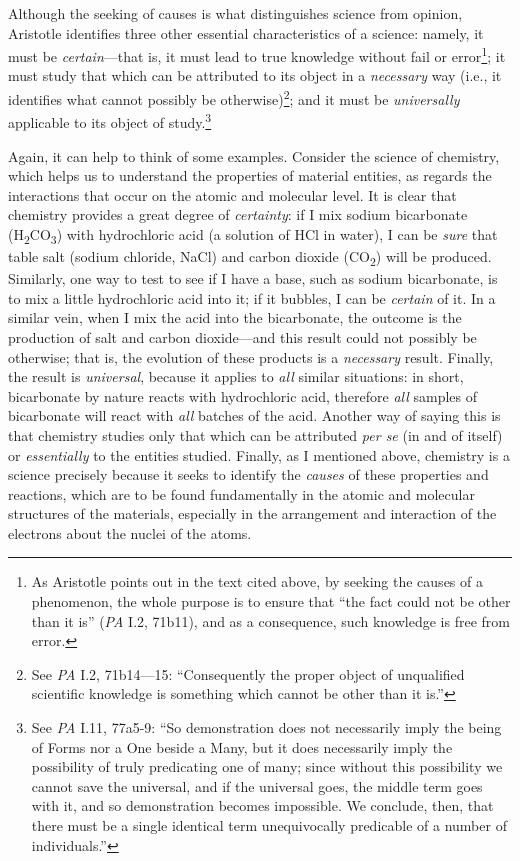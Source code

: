 \documentclass[article,12pt,a4paper,oneside]{memoir}
\begin{document}
    Although the seeking of causes is what distinguishes science from
    opinion, Aristotle identifies three other essential characteristics
    of a science: namely, it must be \emph{certain}---that is, it must
    lead to true knowledge without fail or error\footnote{As Aristotle
      points out in the text cited above, by seeking the causes of a
      phenomenon, the whole purpose is to ensure that ``the fact could
      not be other than it is'' (\emph{PA} I.2, 71b11), and as a
      consequence, such knowledge is free from error.}; it must study
    that which can be attributed to its object in a \emph{necessary} way
    (i.e., it identifies what cannot possibly be otherwise)\footnote{See
      \emph{PA} I.2, 71b14---15: ``Consequently the proper object of
      unqualified scientific knowledge is something which cannot be
      other than it is.''}; and it must be \emph{universally} applicable
    to its object of study.\footnote{See \emph{PA} I.11, 77a5-9: ``So
      demonstration does not necessarily imply the being of Forms nor a
      One beside a Many, but it does necessarily imply the possibility
      of truly predicating one of many; since without this possibility
      we cannot save the universal, and if the universal goes, the
      middle term goes with it, and so demonstration becomes impossible.
      We conclude, then, that there must be a single identical term
      unequivocally predicable of a number of individuals.''}

    Again, it can help to think of some examples. Consider the science
    of chemistry, which helps us to understand the properties of
    material entities, as regards the interactions that occur on the
    atomic and molecular level. It is clear that chemistry provides a
    great degree of \emph{certainty}: if I mix sodium bicarbonate
    (H\textsubscript{2}CO\textsubscript{3}) with hydrochloric acid (a
    solution of HCl in water), I can be \emph{sure} that table salt
    (sodium chloride, NaCl) and carbon dioxide (CO\textsubscript{2})
    will be produced. Similarly, one way to test to see if I have a
    base, such as sodium bicarbonate, is to mix a little hydrochloric
    acid into it; if it bubbles, I can be \emph{certain} of it. In a
    similar vein, when I mix the acid into the bicarbonate, the outcome
    is the production of salt and carbon dioxide---and this result could
    not possibly be otherwise; that is, the evolution of these products
    is a \emph{necessary} result. Finally, the result is
    \emph{universal}, because it applies to \emph{all} similar
    situations: in short, bicarbonate by nature reacts with hydrochloric
    acid, therefore \emph{all} samples of bicarbonate will react with
    \emph{all} batches of the acid. Another way of saying this is that
    chemistry studies only that which can be attributed \emph{per se}
    (in and of itself) or \emph{essentially} to the entities studied.
    Finally, as I mentioned above, chemistry is a science precisely
    because it seeks to identify the \emph{causes} of these properties
    and reactions, which are to be found fundamentally in the atomic and
    molecular structures of the materials, especially in the arrangement
    and interaction of the electrons about the nuclei of the atoms.
\end{document}
